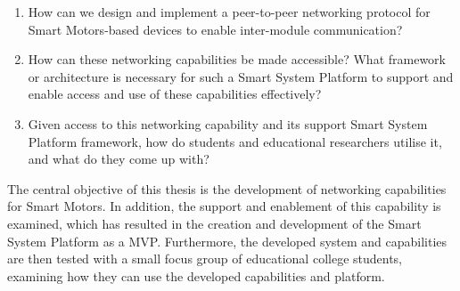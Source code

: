 \begin{enumerate}
    \item How can we design and implement a peer-to-peer networking protocol for Smart Motors-based devices to enable inter-module communication?
    \item How can these networking capabilities be made accessible? What framework or architecture is necessary for such a Smart System Platform to support and enable access and use of these capabilities effectively?
    \item Given access to this networking capability and its support Smart System Platform framework, how do students and educational researchers utilise it, and what do they come up with?
    
\end{enumerate}

The central objective of this thesis is the development of networking capabilities for Smart Motors. In addition, the support and enablement of this capability is examined, which has resulted in the creation and development of the Smart System Platform as a MVP. Furthermore, the developed system and capabilities are then tested with a small focus group of educational college students, examining how they can use the developed capabilities and platform. 



